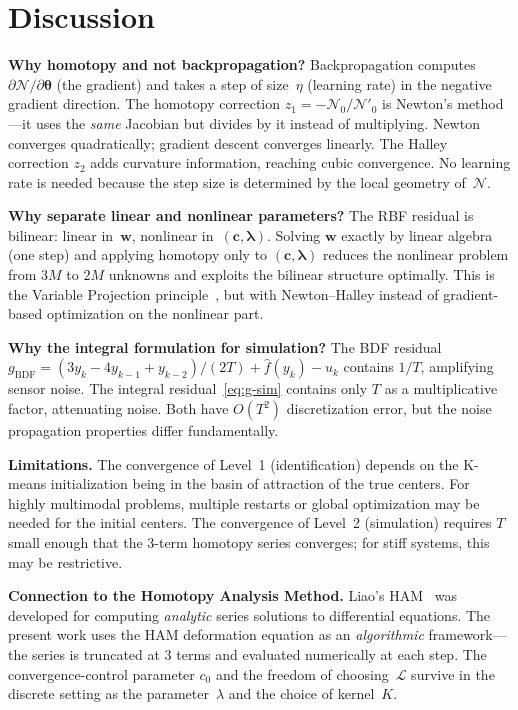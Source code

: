 \documentclass[11pt,a4paper]{article}
\begin{document}
\section{Discussion}
\label{sec:discussion}

\textbf{Why homotopy and not backpropagation?} Backpropagation computes $\partial\mathcal{N}/\partial\boldsymbol{\theta}$ (the gradient) and takes a step of size~$\eta$ (learning rate) in the negative gradient direction. The homotopy correction $z_1 = -\mathcal{N}_0/\mathcal{N}'_0$ is Newton's method---it uses the \emph{same} Jacobian but divides by it instead of multiplying. Newton converges quadratically; gradient descent converges linearly. The Halley correction $z_2$ adds curvature information, reaching cubic convergence. No learning rate is needed because the step size is determined by the local geometry of~$\mathcal{N}$.

\textbf{Why separate linear and nonlinear parameters?} The RBF residual is bilinear: linear in~$\mathbf{w}$, nonlinear in~$(\mathbf{c}, \boldsymbol{\lambda})$. Solving $\mathbf{w}$ exactly by linear algebra (one step) and applying homotopy only to $(\mathbf{c}, \boldsymbol{\lambda})$ reduces the nonlinear problem from $3M$ to $2M$ unknowns and exploits the bilinear structure optimally. This is the Variable Projection principle~\cite{GolubPereyra1973}, but with Newton--Halley instead of gradient-based optimization on the nonlinear part.

\textbf{Why the integral formulation for simulation?} The BDF residual $g_{\mathrm{BDF}} = (3y_k - 4y_{k-1} + y_{k-2})/(2T) + \hat{f}(y_k) - u_k$ contains $1/T$, amplifying sensor noise. The integral residual~\eqref{eq:g-sim} contains only $T$ as a multiplicative factor, attenuating noise. Both have $O(T^2)$ discretization error, but the noise propagation properties differ fundamentally.

\textbf{Limitations.} The convergence of Level~1 (identification) depends on the K-means initialization being in the basin of attraction of the true centers. For highly multimodal problems, multiple restarts or global optimization may be needed for the initial centers. The convergence of Level~2 (simulation) requires $T$ small enough that the 3-term homotopy series converges; for stiff systems, this may be restrictive.

\textbf{Connection to the Homotopy Analysis Method.} Liao's HAM~\cite{Liao2003} was developed for computing \emph{analytic} series solutions to differential equations. The present work uses the HAM deformation equation as an \emph{algorithmic} framework---the series is truncated at 3 terms and evaluated numerically at each step. The convergence-control parameter $c_0$ and the freedom of choosing~$\mathcal{L}$ survive in the discrete setting as the parameter~$\lambda$ and the choice of kernel~$K$.
\end{document}
